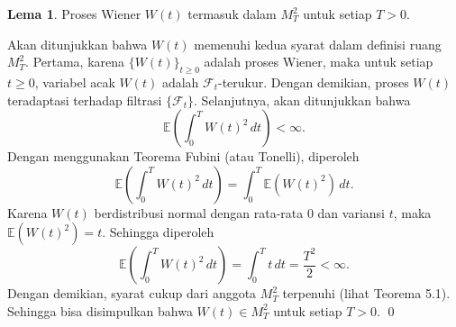 \documentclass[aspectratio=169,11pt]{beamer}
\theoremstyle{definition}
\newtheorem{lema}{Lema}
\begin{document}
\begin{frame}[allowframebreaks]{\insertsection}{\insertsubsection}
  \begin{lema}
    Proses Wiener $W(t)$ termasuk dalam $M_T^2$ untuk setiap $T > 0$.
  \end{lema}
  Akan ditunjukkan bahwa $W(t)$ memenuhi kedua syarat dalam definisi ruang $M_T^2$. Pertama, karena $\{W(t)\}_{t \geq 0}$ adalah proses Wiener, maka untuk setiap $t \geq 0$, variabel acak $W(t)$ adalah $\mathcal{F}_t$-terukur. Dengan demikian, proses $W(t)$ teradaptasi terhadap filtrasi $\{\mathcal{F}_t\}$. Selanjutnya, akan ditunjukkan bahwa
  \begin{equation*}
    \mathbb{E}\left(\int_0^T W(t)^2 \, dt\right) < \infty.
  \end{equation*}
  Dengan menggunakan Teorema Fubini (atau Tonelli), diperoleh
  \begin{equation*}
    \mathbb{E}\left(\int_0^T W(t)^2 \, dt\right) = \int_0^T \mathbb{E}(W(t)^2) \, dt.
  \end{equation*}
  Karena $W(t)$ berdistribusi normal dengan rata-rata $0$ dan variansi $t$, maka $\mathbb{E}(W(t)^2) = t$.
  Sehingga diperoleh
  \begin{equation*}
    \mathbb{E}\left(\int_0^T W(t)^2 \, dt\right) = \int_0^T t \, dt = \frac{T^2}{2} < \infty.
  \end{equation*}
  Dengan demikian, syarat cukup dari anggota $M_T^2$ terpenuhi (lihat Teorema 5.1). Sehingga bisa disimpulkan bahwa $W(t) \in M_T^2$ untuk setiap $T > 0$. \qed
\end{frame}
\end{document}
